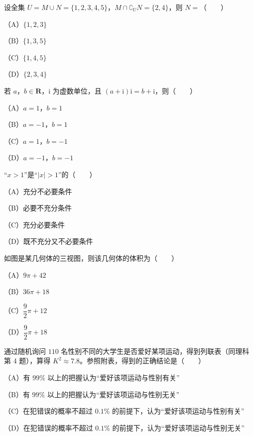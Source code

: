 

\begin{question}
设全集 $U=M\cup N=\{1,2,3,4,5\}$，$M\cap\complement_UN=\{2,4\}$，则 $N=$\mbox{（　　）}

（A）$\{1,2,3\}$

（B）$\{1,3,5\}$

（C）$\{1,4,5\}$

（D）$\{2,3,4\}$

\end{question}
\begin{question}
若 $a$，$b\in\mathbf R$，$\mathrm i$ 为虚数单位，且 $(a+\mathrm i)\mathrm i=b+\mathrm i$，则\mbox{（　　）}

（A）$a=1$，$b=1$

（B）$a=-1$，$b=1$

（C）$a=1$，$b=-1$

（D）$a=-1$，$b=-1$

\end{question}
\begin{question}
“$x>1$”是“$|x|>1$”的\mbox{（　　）}

（A）充分不必要条件

（B）必要不充分条件

（C）充分必要条件

（D）既不充分又不必要条件

\Needspace{0.4\textheight}
\end{question}
\begin{question}
如图是某几何体的三视图，则该几何体的体积为\mbox{（　　）}

（A）$9\pi+42$

（B）$36\pi+18$

（C）$\dfrac92\pi+12$

（D）$\dfrac92\pi+18$
\nopagebreak[4]
\begin{center}\end{center}
\nopagebreak[4]
\end{question}
\begin{question}
通过随机询问 $110$ 名性别不同的大学生是否爱好某项运动，得到列联表（同理科第 4 题），算得 $K^2\approx7.8$。参照附表，得到的正确结论是\mbox{（　　）}

（A）有 $99\%$ 以上的把握认为“爱好该项运动与性别有关”

（B）有 $99\%$ 以上的把握认为“爱好该项运动与性别无关”

（C）在犯错误的概率不超过 $0.1\%$ 的前提下，认为“爱好该项运动与性别有关”

（D）在犯错误的概率不超过 $0.1\%$ 的前提下，认为“爱好该项运动与性别无关”

\end{question}
